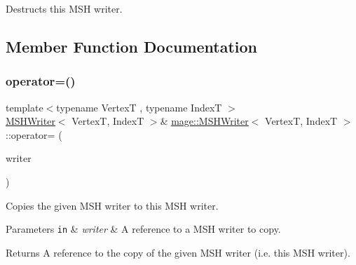 Destructs this M\+SH writer. 

\subsection{Member Function Documentation}
\hypertarget{classmage_1_1_m_s_h_writer_a2c44587daf98ba5565ac883878b61c9e}{}\label{classmage_1_1_m_s_h_writer_a2c44587daf98ba5565ac883878b61c9e} 
\subsubsection{\texorpdfstring{operator=()}{operator=()}\hspace{0.1cm}{\footnotesize\ttfamily [1/2]}}
{\footnotesize\ttfamily template$<$typename VertexT , typename IndexT $>$ \\
\hyperlink{classmage_1_1_m_s_h_writer}{M\+S\+H\+Writer}$<$ VertexT, IndexT $>$\& \hyperlink{classmage_1_1_m_s_h_writer}{mage\+::\+M\+S\+H\+Writer}$<$ VertexT, IndexT $>$\+::operator= (\begin{DoxyParamCaption}\item[{const \hyperlink{classmage_1_1_m_s_h_writer}{M\+S\+H\+Writer}$<$ VertexT, IndexT $>$ \&}]{writer }\end{DoxyParamCaption})\hspace{0.3cm}{\ttfamily [delete]}}

Copies the given M\+SH writer to this M\+SH writer.


\begin{DoxyParams}[1]{Parameters}
\mbox{\tt in}  & {\em writer} & A reference to a M\+SH writer to copy. \\
\hline
\end{DoxyParams}
\begin{DoxyReturn}{Returns}
A reference to the copy of the given M\+SH writer (i.\+e. this M\+SH writer). 
\end{DoxyReturn}
\hypertarget{classmage_1_1_m_s_h_writer_ae1fddfee32bfcf1e6b9f031749cdbbcb}{}\label{classmage_1_1_m_s_h_writer_ae1fddfee32bfcf1e6b9f031749cdbbcb} 
